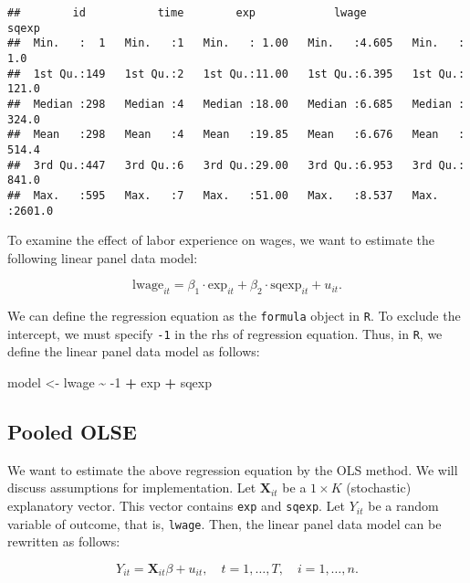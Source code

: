 \documentclass[
  12pt,
]{article}
\newenvironment{Shaded}{\begin{snugshade}}{\end{snugshade}}
\newcommand{\DecValTok}[1]{\textcolor[rgb]{0.00,0.00,0.81}{#1}}
\newcommand{\NormalTok}[1]{#1}
\newcommand{\OperatorTok}[1]{\textcolor[rgb]{0.81,0.36,0.00}{\textbf{#1}}}
\newcommand{\StringTok}[1]{\textcolor[rgb]{0.31,0.60,0.02}{#1}}
\begin{document}
\begin{verbatim}
##        id           time        exp            lwage           sqexp       
##  Min.   :  1   Min.   :1   Min.   : 1.00   Min.   :4.605   Min.   :   1.0  
##  1st Qu.:149   1st Qu.:2   1st Qu.:11.00   1st Qu.:6.395   1st Qu.: 121.0  
##  Median :298   Median :4   Median :18.00   Median :6.685   Median : 324.0  
##  Mean   :298   Mean   :4   Mean   :19.85   Mean   :6.676   Mean   : 514.4  
##  3rd Qu.:447   3rd Qu.:6   3rd Qu.:29.00   3rd Qu.:6.953   3rd Qu.: 841.0  
##  Max.   :595   Max.   :7   Max.   :51.00   Max.   :8.537   Max.   :2601.0
\end{verbatim}

To examine the effect of labor experience on wages,
we want to estimate the following linear panel data model:

\[
  \text{lwage}_{it} = 
  \beta_1 \cdot \text{exp}_{it} +
  \beta_2 \cdot \text{sqexp}_{it} + 
  u_{it}.
\]

We can define the regression equation as the \texttt{formula} object in \texttt{R}.
To exclude the intercept, we must specify \texttt{-1} in the rhs of regression equation.
Thus, in \texttt{R}, we define the linear panel data model as follows:

\begin{Shaded}
\begin{Highlighting}[]
\NormalTok{model \textless{}{-}}\StringTok{ }\NormalTok{lwage }\OperatorTok{\textasciitilde{}}\StringTok{ }\DecValTok{{-}1} \OperatorTok{+}\StringTok{ }\NormalTok{exp }\OperatorTok{+}\StringTok{ }\NormalTok{sqexp}
\end{Highlighting}
\end{Shaded}

\hypertarget{pooled-olse}{%
\subsection{Pooled OLSE}\label{pooled-olse}}

We want to estimate the above regression equation by the OLS method.
We will discuss assumptions for implementation.
Let \(\mathbf{X}_{it}\) be a \(1 \times K\) (stochastic) explanatory vector.
This vector contains \texttt{exp} and \texttt{sqexp}.
Let \(Y_{it}\) be a random variable of outcome, that is, \texttt{lwage}.
Then, the linear panel data model can be rewritten as follows:

\[
  Y_{it} = \mathbf{X}_{it} \beta + u_{it}, \quad t = 1, \ldots, T, \quad i = 1, \ldots, n.
\]
\end{document}

